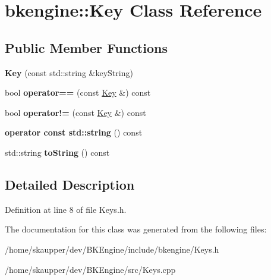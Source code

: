 \hypertarget{classbkengine_1_1Key}{}\section{bkengine\+:\+:Key Class Reference}
\label{classbkengine_1_1Key}
\subsection*{Public Member Functions}
\begin{DoxyCompactItemize}
\item 
\mbox{\label{classbkengine_1_1Key_a54ce3095078f60337098fd48c0af785b}} 
{\bfseries Key} (const std\+::string \&key\+String)
\item 
\mbox{\label{classbkengine_1_1Key_a8cb85e358786ea8bf137a68fa8e72307}} 
bool {\bfseries operator==} (const \hyperlink{classbkengine_1_1Key}{Key} \&) const
\item 
\mbox{\label{classbkengine_1_1Key_a2d1bc06b124e7757ac4df2950d2fc108}} 
bool {\bfseries operator!=} (const \hyperlink{classbkengine_1_1Key}{Key} \&) const
\item 
\mbox{\label{classbkengine_1_1Key_a13a320efc0b88e3dee46c3413e23351a}} 
{\bfseries operator const std\+::string} () const
\item 
\mbox{\label{classbkengine_1_1Key_ae097454f3d2b400816700e9b6b9738a1}} 
std\+::string {\bfseries to\+String} () const
\end{DoxyCompactItemize}


\subsection{Detailed Description}


Definition at line 8 of file Keys.\+h.



The documentation for this class was generated from the following files\+:\begin{DoxyCompactItemize}
\item 
/home/skaupper/dev/\+B\+K\+Engine/include/bkengine/Keys.\+h\item 
/home/skaupper/dev/\+B\+K\+Engine/src/Keys.\+cpp\end{DoxyCompactItemize}
